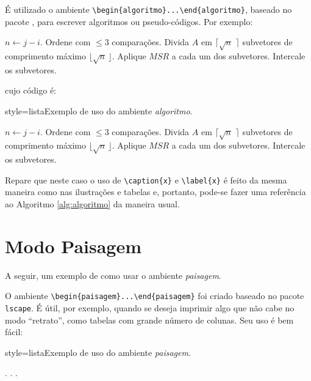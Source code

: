 É utilizado o ambiente \Verb+\begin{algoritmo}...\end{algoritmo}+, baseado no pacote , para escrever algoritmos ou pseudo-códigos. Por exemplo:

\begin{algoritmo}
\caption{$MSR(A,i,j)$.}\label{alg:algoritmo}
 \DontPrintSemicolon
 \LinesNumbered
 \SetAlgoLined
 \BlankLine
 \BlankLine
 $n \leftarrow j - i$.\;
   {Ordene com $\leq 3$ comparações.}
   {Divida $A$ em $\lceil\sqrt{n}\,\,\rceil$ subvetores de comprimento máximo $\lfloor\sqrt{n}\,\rfloor$.\;
    Aplique $MSR$ a cada um dos subvetores.\;
    Intercale os subvetores.\;}    
\end{algoritmo}

\noindent
cujo código é:

\begin{codigo}{style=lista}{Exemplo de uso do ambiente \textit{algoritmo}.}
\begin{algoritmo}
\caption{$MSR(A,i,j)$.}\label{alg:algoritmo}
 \DontPrintSemicolon
 \LinesNumbered
 \SetAlgoLined
 \BlankLine
 \BlankLine
 $n \leftarrow j - i$.\;
   {Ordene com $\leq 3$ comparações.}
   {Divida $A$ em $\lceil\sqrt{n}\,\,\rceil$ subvetores de comprimento máximo $\lfloor\sqrt{n}\,\rfloor$.\;
    Aplique $MSR$ a cada um dos subvetores.\;
    Intercale os subvetores.\;}
\end{algoritmo}
\end{codigo}

Repare que neste caso o uso de \Verb+\caption{x}+ e \Verb+\label{x}+ é feito da mesma maneira como nas ilustrações e tabelas e, portanto, pode-se fazer uma referência ao Algoritmo \ref{alg:algoritmo} da maneira usual.

\section{Modo Paisagem}

A seguir, um exemplo de como usar o ambiente \emph{paisagem}.

\begin{paisagem}
O ambiente \Verb+\begin{paisagem}...\end{paisagem}+ foi criado baseado no pacote \texttt{lscape}. É útil, por exemplo, quando se deseja imprimir algo que não cabe no modo ``retrato'', como tabelas com grande número de colunas. Seu uso é bem fácil:

\begin{codigo}{style=lista}{Exemplo de uso do ambiente \textit{paisagem}.}
\begin{paisagem}
.
.
.
\end{paisagem}
\end{codigo}
\end{paisagem}

